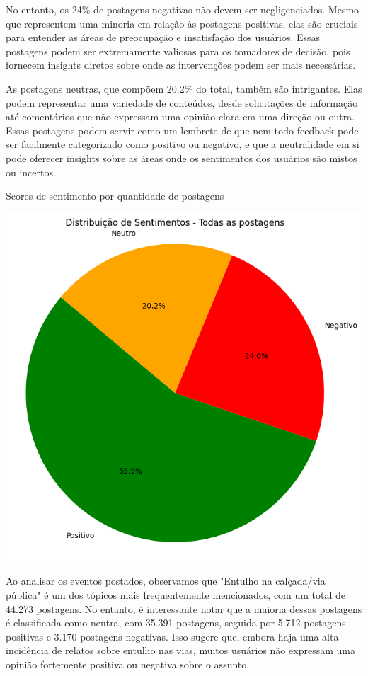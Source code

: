 No entanto, os 24\% de postagens negativas não devem ser negligenciados. Mesmo que representem uma minoria em relação às postagens positivas, elas são cruciais para entender as áreas de preocupação e insatisfação dos usuários. Essas postagens podem ser extremamente valiosas para os tomadores de decisão, pois fornecem insights diretos sobre onde as intervenções podem ser mais necessárias.

As postagens neutras, que compõem 20.2\% do total, também são intrigantes. Elas podem representar uma variedade de conteúdos, desde solicitações de informação até comentários que não expressam uma opinião clara em uma direção ou outra. Essas postagens podem servir como um lembrete de que nem todo feedback pode ser facilmente categorizado como positivo ou negativo, e que a neutralidade em si pode oferecer insights sobre as áreas onde os sentimentos dos usuários são mistos ou incertos.

\begin{quadro}[!htb]
	\caption{Scores de sentimento por quantidade de postagens}
	\label{fig:pie_sentiment_breakdown}
	\centering
	\includegraphics[scale=0.5]{images/pie_sentiment_breakdown.png}
	\fautor
\end{quadro}

Ao analisar os eventos postados, observamos que "Entulho na calçada/via pública" é um dos tópicos mais frequentemente mencionados, com um total de 44.273 postagens. No entanto, é interessante notar que a maioria dessas postagens é classificada como neutra, com 35.391 postagens, seguida por 5.712 postagens positivas e 3.170 postagens negativas. Isso sugere que, embora haja uma alta incidência de relatos sobre entulho nas vias, muitos usuários não expressam uma opinião fortemente positiva ou negativa sobre o assunto.

